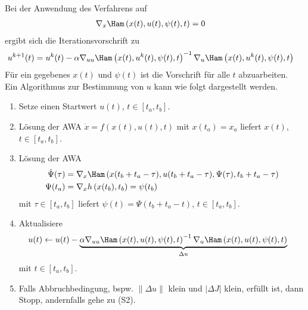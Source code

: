 Bei der Anwendung des Verfahrens auf 
\begin{align*}
 \nabla_x\Ham\left(x(t),u(t),\psi(t),t \right) & = 0
\end{align*}
ergibt sich die Iterationsvorschrift zu
\begin{align*}
	u^{k+1}(t) & = u^{k}(t) -\alpha\nabla_{uu}\Ham\left(x(t),u^k(t),\psi(t),t \right)^{-1}\nabla_u\Ham\left(x(t),u^k(t),\psi(t),t \right)
\end{align*}
Für ein gegebenes $x(t)$ und $\psi(t)$ ist die Vorschrift für alle $t$ abzuarbeiten.\\
Ein Algorithmus zur Bestimmung von $u$ kann wie folgt dargestellt werden.
\begin{enumerate}[label=(S\arabic*)]
  \item Setze einen Startwert $u(t)$, $t\in[t_a,t_b]$.
  \item Lösung der \ac{AWA} $\dot{x}=f\left(x(t),u(t),t \right)$ mit $x(t_a)=x_a$ liefert $x(t)$, $t\in[t_a,t_b]$.
  \item Lösung der \ac{AWA}
  \begin{align*}
  	\dot{\Psi}(\tau) & = \nabla_x\Ham\left(x(t_b+t_a-\tau),u(t_b+t_a-\tau),\Psi(\tau),t_b+t_a-\tau \right)\\
  	\Psi(t_a) & = \nabla_xh\left(x(t_b),t_b \right) = \psi(t_b)
  \end{align*}
  mit $\tau\in[t_a,t_b]$ liefert $\psi(t)=\Psi\left(t_b + t_a -t\right)$, $t\in[t_a,t_b]$.
  \item Aktualisiere 
  \begin{align*}
  	u(t) & \leftarrow u(t)-\underbrace{\alpha\nabla_{uu}\Ham\left(x(t),u(t),\psi(t),t \right)^{-1}\nabla_u\Ham\left(x(t),u(t),\psi(t),t \right)
  	}_{\Delta u}
  \end{align*} 
  mit $t\in[t_a,t_b]$.
  \item Falls Abbruchbedingung, bspw. $\|\Delta u\|$ klein und $|\Delta J|$ klein, erfüllt ist, dann Stopp, andernfalls gehe zu (S2).
\end{enumerate}
